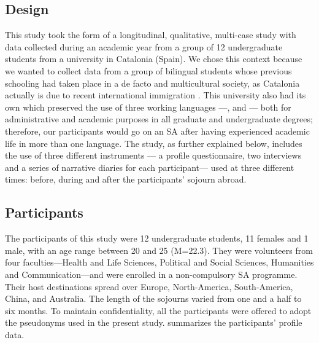 \documentclass[output=paper]{langsci/langscibook}
\begin{document}
\subsection{Design}


This study took the form of a longitudinal, qualitative, multi-case study with data collected during an academic year from a group of 12 undergraduate students from a university in Catalonia (Spain). We chose this context because we wanted to collect data from a group of bilingual students whose previous schooling had taken place in a de facto  and multicultural society, as Catalonia actually is due to recent international immigration \citep{Trenchs-PareraNewman2015}. This university also had its own  which preserved the use of three working languages —,  and — both for administrative and academic purposes in all graduate and undergraduate degrees; therefore, our participants would go on an SA after having experienced academic life in more than one language. The study, as further explained below, includes the use of three different instruments — a profile questionnaire, two interviews and a series of narrative diaries for each participant— used at three different times: before, during and after the participants’ sojourn abroad.


 
\subsection{Participants}
\largerpage

The participants of this study were 12 undergraduate students, 11 females and 1 male, with an age range between 20 and 25 (M=22.3). They were volunteers from four faculties—Health and Life Sciences, Political and Social Sciences, Humanities and Communication—and were enrolled in a non-compulsory SA programme. Their host destinations spread over Europe, North-America, South-America, Chi\-na, and Australia. The length of the sojourns varied from one and a half to six months. To maintain confidentiality, all the participants were offered to adopt the pseudo\-nyms used in the present study.   summarizes the participants’ profile data.
\end{document}
